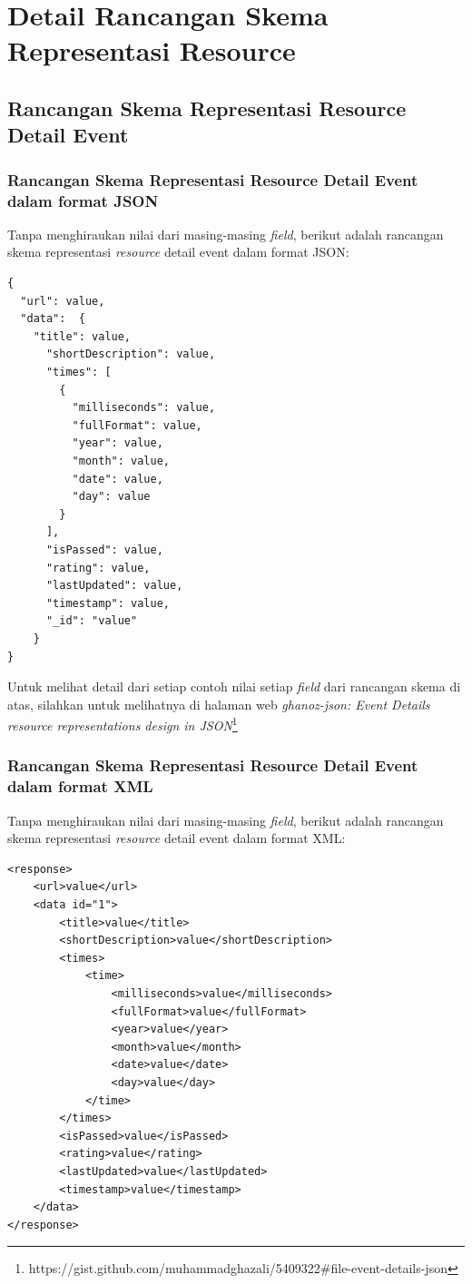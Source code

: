\documentclass[a4paper, 12pt, oneside]{report}
\begin{document}
\chapter{Detail Rancangan Skema Representasi Resource} \label{lampiran:detail-rancangan-skema-representasi-res}
\section{Rancangan Skema Representasi Resource Detail Event}
\subsection{Rancangan Skema Representasi Resource Detail Event dalam format JSON}
\onehalfspacing Tanpa menghiraukan nilai dari masing-masing \textit{field}, berikut adalah rancangan skema representasi \textit{resource} detail event dalam format JSON:

\begin{lstlisting}[frame=single]
{
  "url": value,
  "data":  {
    "title": value,
      "shortDescription": value,
      "times": [
        {
          "milliseconds": value,
          "fullFormat": value,
          "year": value,
          "month": value,
          "date": value,
          "day": value
        }
      ],
      "isPassed": value,
      "rating": value,
      "lastUpdated": value,
      "timestamp": value,
      "_id": "value"
    }
}
\end{lstlisting}

\onehalfspacing Untuk melihat detail dari setiap contoh nilai setiap \textit{field} dari rancangan skema di atas, silahkan untuk melihatnya di halaman web \textit{ghanoz-json: Event Details resource representations design in JSON}\footnote{https://gist.github.com/muhammadghazali/5409322\#file-event-details-json}

\subsection{Rancangan Skema Representasi Resource Detail Event dalam format XML}
\onehalfspacing Tanpa menghiraukan nilai dari masing-masing \textit{field}, berikut adalah rancangan skema representasi \textit{resource} detail event dalam format XML:

\begin{lstlisting}[frame=single]
<response>
    <url>value</url>
    <data id="1">
        <title>value</title>
        <shortDescription>value</shortDescription>
        <times>
            <time>
                <milliseconds>value</milliseconds>
                <fullFormat>value</fullFormat>
                <year>value</year>
                <month>value</month>
                <date>value</date>
                <day>value</day>
            </time>
        </times>
        <isPassed>value</isPassed>
        <rating>value</rating>
        <lastUpdated>value</lastUpdated>
        <timestamp>value</timestamp>
    </data>
</response>
\end{lstlisting}
\end{document}
